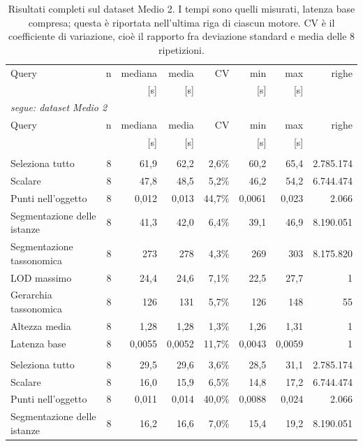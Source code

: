 \begin{small}
\begin{longtable}{lrrrrrr r}
\caption{Risultati completi sul dataset Medio 2. I tempi sono quelli misurati, latenza base compresa; questa è riportata nell'ultima riga di ciascun motore. CV è il coefficiente di variazione, cioè il rapporto fra deviazione standard e media delle 8 ripetizioni.}\label{tab:raw_nettuno}\\
\toprule
Query & n & mediana & media & CV & min & max & righe \\
 & & [s] & [s] & & [s] & [s] & \\
\midrule
\endfirsthead
\multicolumn{8}{l}{\small\itshape segue: dataset Medio 2}\\
\toprule
Query & n & mediana & media & CV & min & max & righe \\
 & & [s] & [s] & & [s] & [s] & \\
\midrule
\endhead
\endfoot
\bottomrule
\endlastfoot
\multicolumn{8}{l}{\textbf{Fuseki}}\\
\quad Seleziona tutto & 8 & 61,9 & 62,2 & 2,6\% & 60,2 & 65,4 & 2.785.174 \\
\quad Scalare & 8 & 47,8 & 48,5 & 5,2\% & 46,2 & 54,2 & 6.744.474 \\
\quad Punti nell'oggetto & 8 & 0,012 & 0,013 & 44,7\% & 0,0061 & 0,023 & 2.066 \\
\quad Segmentazione delle istanze & 8 & 41,3 & 42,0 & 6,4\% & 39,1 & 46,9 & 8.190.051 \\
\quad Segmentazione tassonomica & 8 & 273 & 278 & 4,3\% & 269 & 303 & 8.175.820 \\
\quad LOD massimo & 8 & 24,4 & 24,6 & 7,1\% & 22,5 & 27,7 & 1 \\
\quad Gerarchia tassonomica & 8 & 126 & 131 & 5,7\% & 126 & 148 & 55 \\
\quad Altezza media & 8 & 1,28 & 1,28 & 1,3\% & 1,26 & 1,31 & 1 \\
\quad Latenza base & 8 & 0,0055 & 0,0052 & 11,7\% & 0,0043 & 0,0059 & 1 \\
\addlinespace
\multicolumn{8}{l}{\textbf{GraphDB}}\\
\quad Seleziona tutto & 8 & 29,5 & 29,6 & 3,6\% & 28,5 & 31,1 & 2.785.174 \\
\quad Scalare & 8 & 16,0 & 15,9 & 6,5\% & 14,8 & 17,2 & 6.744.474 \\
\quad Punti nell'oggetto & 8 & 0,011 & 0,014 & 40,0\% & 0,0088 & 0,024 & 2.066 \\
\quad Segmentazione delle istanze & 8 & 16,2 & 16,6 & 7,0\% & 15,4 & 19,2 & 8.190.051 \\

\end{longtable}
\end{small}
